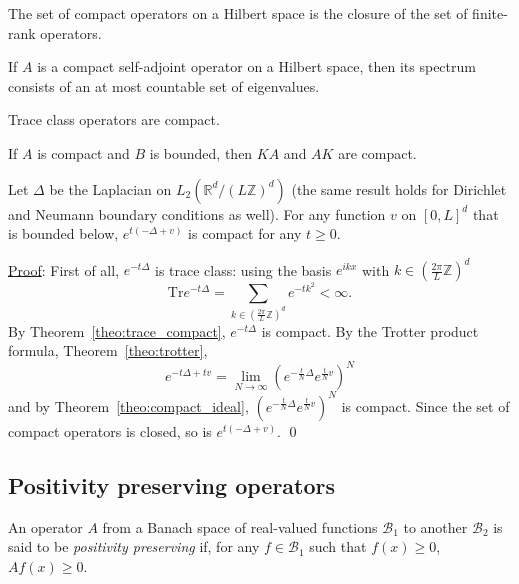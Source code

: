 \documentclass{ian}
\begin{document}
  The set of compact operators on a Hilbert space is the closure of the set of finite-rank operators.
\endtheo
\bigskip

  If $A$ is a compact self-adjoint operator on a Hilbert space, then its spectrum consists of an at most countable set of eigenvalues.
\endtheo
\bigskip

\label{theo:trace_compact}
  Trace class operators are compact.
\endtheo
\bigskip

\label{theo:compact_ideal}
  If $A$ is compact and $B$ is bounded, then $KA$ and $AK$ are compact.
\endtheo
\bigskip

\label{theo:compact_schrodinger}
  Let $\Delta$ be the Laplacian on $L_2(\mathbb R^d/(L\mathbb Z)^d)$ (the same result holds for Dirichlet and Neumann boundary conditions as well).
  For any function $v$ on $[0,L]^d$ that is bounded below, $e^{t(-\Delta+v)}$ is compact for any $t\geqslant 0$.
\endtheo
\bigskip

\indent\underline{Proof}:
  First of all, $e^{-t\Delta}$ is trace class: using the basis $e^{ikx}$ with $k\in(\frac{2\pi}L\mathbb Z)^d$
  \begin{equation}
    \mathrm{Tr}e^{-t\Delta}
    =\sum_{k\in(\frac{2\pi}L\mathbb Z)^d}e^{-tk^2}<\infty
    .
  \end{equation}
  By Theorem\-~\ref{theo:trace_compact}, $e^{-t\Delta}$ is compact.
  By the Trotter product formula, Theorem\-~\ref{theo:trotter},
  \begin{equation}
    e^{-t\Delta+tv}
    =\lim_{N\to\infty}(e^{-\frac tN\Delta}e^{\frac tNv})^N
  \end{equation}
  and by Theorem\-~\ref{theo:compact_ideal}, $(e^{-\frac tN\Delta}e^{\frac tNv})^N$ is compact.
  Since the set of compact operators is closed, so is $e^{t(-\Delta+v)}$.
\qed

\subsection{Positivity preserving operators}\label{app:positivity_preserving}
\label{def:positivity_preserving}
  An operator $A$ from a Banach space of real-valued functions $\mathcal B_1$ to another $\mathcal B_2$ is said to be {\it positivity preserving} if, for any $f\in\mathcal B_1$ such that $f(x)\geqslant0$, $Af(x)\geqslant 0$.
\endtheo
\bigskip
\end{document}
